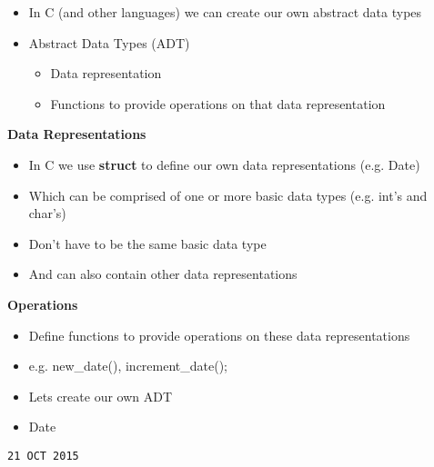 \documentclass{beamer}
\begin{document}
\begin{frame}
\begin{itemize}
\item In C (and other languages) we can create our own abstract data types 
\bigskip
\item Abstract Data Types (ADT)
\begin{itemize}
\item Data representation
\item Functions to provide operations on that data representation
\end{itemize}
\end{itemize}
\end{frame}

\begin{frame}
\begin{center}
\textbf{Data Representations}
\end{center}
\begin{itemize}
\item In C we use \textbf{struct} to define our own data representations  (e.g. Date)
\item Which can be comprised of one or more basic data types (e.g. int's and char's)
\item Don't have to be the same basic data type
\item And can also contain other data representations
\end{itemize}
\end{frame}

\begin{frame}
\begin{center}
\textbf{Operations}
\end{center}
\begin{itemize}
\item Define functions to provide operations on these data representations
\item e.g. new\_date(), increment\_date();
\end{itemize}
\end{frame}

\begin{frame}[fragile]
\begin{itemize}
\item Lets create our own ADT 
\bigskip
\item Date
\end{itemize}
\begin{block}{}
\begin{lstlisting}
21 OCT 2015 
\end{lstlisting}
\end{block}
\end{frame}
\end{document}
